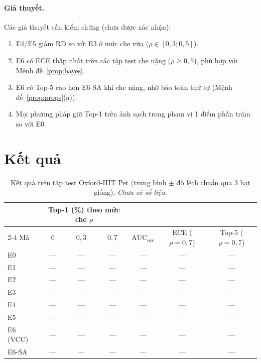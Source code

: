 \documentclass[11pt,a4paper]{article}
\theoremstyle{plain}
\theoremstyle{definition}
\theoremstyle{remark}
\begin{document}
\paragraph{Giả thuyết.} Các giả thuyết cần kiểm chứng (chưa được xác nhận):
\begin{enumerate}[label=\textbf{H\arabic*},itemsep=1pt]
  \item E4/E5 giảm $\mathrm{RD}$ so với E3 ở mức che vừa ($\rho\in[0{,}3;0{,}5]$).
  \item E6 có ECE thấp nhất trên các tập test che nặng ($\rho\ge0{,}5$), phù hợp với Mệnh đề~\ref{prop:bayes}.
  \item E6 có Top-5 cao hơn E6-SA khi che nặng, nhờ bảo toàn thứ tự (Mệnh đề~\ref{prop:props}(a)).
  \item Mọi phương pháp giữ Top-1 trên ảnh sạch trong phạm vi 1 điểm phần trăm so với E0.
\end{enumerate}

\section{Kết quả}
\label{sec:results}

\noindent{}

\begin{table}[h]
\centering
\caption{Kết quả trên tập test Oxford-IIIT Pet (trung bình $\pm$ độ lệch chuẩn qua 3 hạt giống). \emph{Chưa có số liệu.}}
\label{tab:results}
\small
\begin{tabular}{@{}lcccccc@{}}
\toprule
& \multicolumn{3}{c}{Top-1 (\%) theo mức che $\rho$} & & & \\
\cmidrule(lr){2-4}
Mã & $0$ & $0{,}3$ & $0{,}7$ & $\mathrm{AUC}_{\mathrm{occ}}$ & ECE ($\rho\!=\!0{,}7$) & Top-5 ($\rho\!=\!0{,}7$) \\
\midrule
E0 & --- & --- & --- & --- & --- & --- \\
E1 & --- & --- & --- & --- & --- & --- \\
E2 & --- & --- & --- & --- & --- & --- \\
E3 & --- & --- & --- & --- & --- & --- \\
E4 & --- & --- & --- & --- & --- & --- \\
E5 & --- & --- & --- & --- & --- & --- \\
E6 (VCC) & --- & --- & --- & --- & --- & --- \\
E6-SA & --- & --- & --- & --- & --- & --- \\
\bottomrule
\end{tabular}
\end{table}
\end{document}
